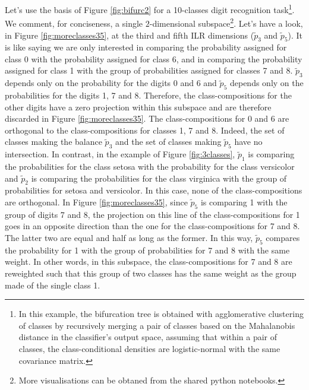 \documentclass{article}
\theoremstyle{plain}
\theoremstyle{definition}
\theoremstyle{remark}
\begin{document}
Let's use the basis of Figure \ref{fig:bifurc2} for a 10-classes digit recognition task\footnote{In this example, the bifurcation tree is obtained with agglomerative clustering of classes by recursively merging a pair of classes based on the Mahalanobis distance in the classifier's output space, assuming that within a pair of classes, the class-conditional densities are logistic-normal \cite{aitchison1980} with the same covariance matrix.}. We comment, for conciseness, a single $2$-dimensional subspace\footnote{More visualisations can be obtaned from the shared python notebooks.}. Let's have a look, in Figure \ref{fig:moreclasses35}, at the third and fifth ILR dimensions ($\tilde{p}_3$ and $\tilde{p}_5$). It is like saying we are only interested in comparing the probability assigned for class 0 with the probability assigned for class 6, and in comparing the probability assigned for class 1 with the group of probabilities assigned for classes 7 and 8. $\tilde{p}_3$ depends only on the probability for the digits 0 and 6 and $\tilde{p}_5$ depends only on the probabilities for the digits 1, 7 and 8. Therefore, the class-compositions for the other digits have a zero projection within this subspace and are therefore discarded in Figure \ref{fig:moreclasses35}. The class-compositions for 0 and 6 are orthogonal to the class-compositions for classes 1, 7 and 8. Indeed, the set of classes making the balance $\tilde{p}_3$ and the set of classes making $\tilde{p}_5$ have no intersection. In contrast, in the example of Figure \ref{fig:3classes}, $\tilde{p}_1$ is comparing the probabilities for the class setosa with the probability for the class versicolor and $\tilde{p}_2$ is comparing the probabilities for the class virginica with the group of probabilities for setosa and versicolor. In this case, none of the class-compositions are orthogonal. In Figure \ref{fig:moreclasses35}, since $\tilde{p}_5$ is comparing 1 with the group of digits 7 and 8, the projection on this line of the class-compositions for 1 goes in an opposite direction than the one for the class-compositions for 7 and 8. The latter two are equal and half as long as the former. In this way, $\tilde{p}_5$ compares the probability for 1 with the group of probabilities for 7 and 8 with the same weight. In other words, in this subspace, the class-compositions for 7 and 8 are reweighted such that this group of two classes has the same weight as the group made of the single class 1.
\end{document}
